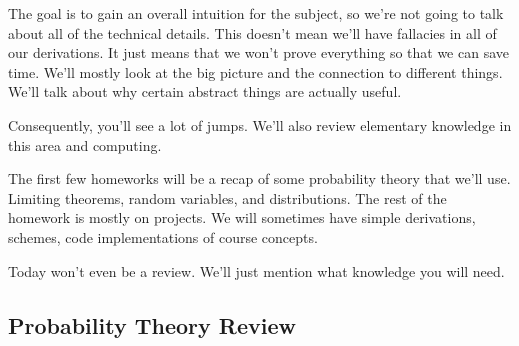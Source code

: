 The goal is to gain an overall intuition for the subject, so we're not going to talk about all of the technical details. This doesn't mean we'll have fallacies in all of our derivations. It just means that we won't prove everything so that we can save time. We'll mostly look at the big picture and the connection to different things. We'll talk about why certain abstract things are actually useful.

Consequently, you'll see a lot of jumps. We'll also review elementary knowledge in this area and computing.

The first few homeworks will be a recap of some probability theory that we'll use. Limiting theorems, random variables, and distributions. The rest of the homework is mostly on projects. We will sometimes have simple derivations, schemes, code implementations of course concepts.


Today won't even be a review. We'll just mention what knowledge you will need.

\subsection{Probability Theory Review}

